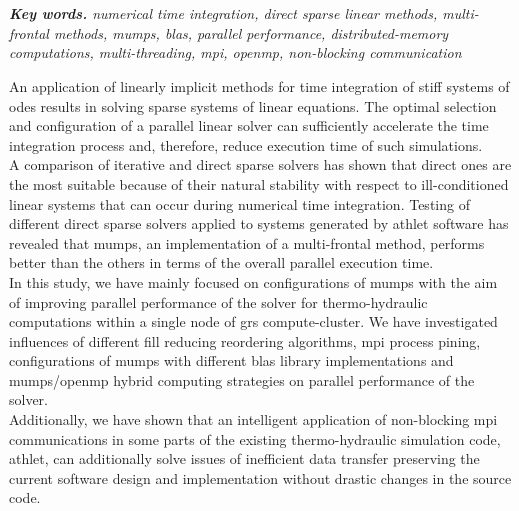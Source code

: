 \chapter{\abstractname}

\textit{\textbf{Key words.} numerical time integration, direct sparse linear methods, multi-frontal methods, \gls{mumps}, \gls{blas}, parallel performance, distributed-memory computations,  multi-threading, \gls{mpi}, \gls{openmp}, non-blocking communication}

\vspace{10mm}


An application of linearly implicit methods for time integration of stiff systems of \gls{ode}s  results in solving sparse systems of linear equations. The optimal selection and configuration of a parallel linear solver can sufficiently accelerate the time integration process and, therefore, reduce execution time of such simulations.\\



A comparison of iterative and direct sparse solvers has shown that direct ones are the most suitable because of their natural stability with respect to ill-conditioned linear systems that can occur during numerical time integration. Testing of different direct sparse solvers applied to systems generated by \gls{athlet} software has revealed that \gls{mumps}, an implementation of a multi-frontal method, performs better than the others in terms of the overall parallel execution time.\\


In this study, we have mainly focused on configurations of \gls{mumps} with the aim of improving parallel performance of the solver for thermo-hydraulic computations within a single node of \gls{grs} compute-cluster. We have investigated influences of  different fill reducing reordering algorithms, \gls{mpi} process pining, configurations of \gls{mumps} with different \gls{blas} library implementations and \gls{mumps}/\gls{openmp} hybrid computing strategies on parallel performance of the solver.\\


Additionally, we have shown that an intelligent application of non-blocking \gls{mpi} communications in some parts of the existing thermo-hydraulic simulation code, \gls{athlet}, can additionally solve issues of inefficient data transfer preserving the current software design and implementation without drastic changes in the source code.\\